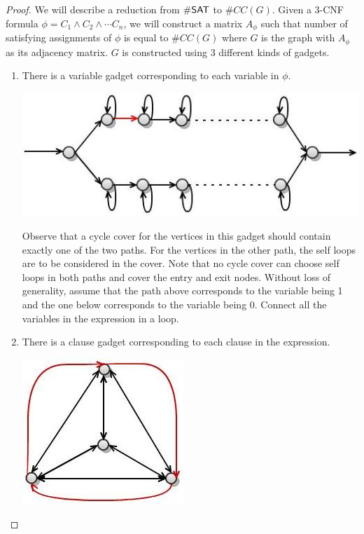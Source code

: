 \documentclass[11pt]{article}
\begin{document}
    \begin{proof}
We will describe a reduction from $\#{\mathsf{SAT}}$ to $\#CC(G)$. Given a 3-CNF formula $\phi = C_1 \wedge C_2 \wedge \cdots C_n $, we will construct a matrix $A_\phi$ such that number of satisfying assignments of $\phi$ is equal to $\#CC(G)$ where $G$ is the graph with $A_{\phi}$ as its adjacency matrix. $G$ is constructed using 3 different kinds of gadgets.
        \begin{enumerate}
            \item There is a variable gadget corresponding to each variable in $\phi$.
\begin{center}
\includegraphics[scale=.75]{valiant1.jpg}
\end{center}              
Observe that a cycle cover for the vertices in this gadget should contain exactly one of the two paths. For the vertices in the other path, the self loops are to be considered in the cover. Note that no cycle cover can choose self loops in both paths and cover the entry and exit nodes. Without loss of generality, assume that the path above corresponds to the variable being 1 and the one below corresponds to the variable being 0.  Connect all the variables in the expression in a loop.
            \item
                There is a clause gadget corresponding to each clause in the expression.
              \begin{center}  
                 \includegraphics[scale=.75]{clause.jpg}
                 \end{center}

\end{enumerate}
\end{proof}
\end{document}
